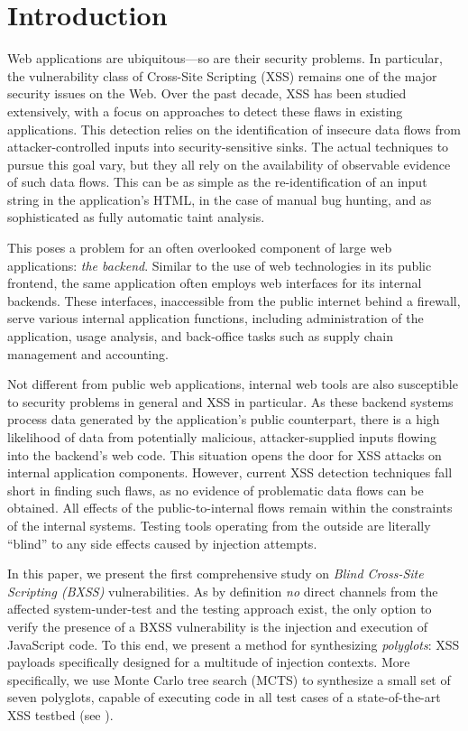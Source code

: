 \section{Introduction}


Web applications are ubiquitous---so are their security problems.
In particular, the vulnerability class of Cross-Site Scripting (XSS) remains one of the major security issues on the Web.
Over the past decade, XSS has been studied extensively, with a focus on approaches to detect these flaws in existing applications.
This detection relies on the identification of insecure data flows from attacker-controlled inputs into security-sensitive sinks. 
The actual techniques to pursue this goal vary, but they all rely on the availability of observable evidence of such data flows.
This can be as simple as the re-identification of an input string in the application's HTML, in the case of manual bug hunting, and as sophisticated as fully automatic taint analysis.

This poses a problem for an often overlooked component of large web applications: \emph{the backend}. Similar to the use of web technologies in its public frontend, the same application often employs web interfaces for its internal backends.
These interfaces, inaccessible from the public internet behind a firewall, serve various internal application functions, including administration of the application, usage analysis, and back-office tasks such as supply chain management and accounting. 

Not different from public web applications, internal web tools are also susceptible to security problems in general and XSS in particular. 
As these backend systems process data generated by the application's public counterpart, there is a high likelihood of data from potentially malicious, attacker-supplied inputs flowing into the backend's web code. 
This situation opens the door for XSS attacks on internal application components.
However, current XSS detection techniques fall short in finding such flaws, as no evidence of problematic data flows can be obtained. All effects of the public-to-internal flows remain within the constraints of the internal systems.
Testing tools operating from the outside are literally ``blind'' to any side effects caused by injection attempts. 

In this paper, we present the first comprehensive study on \textit{Blind Cross-Site Scripting (BXSS)} vulnerabilities. As by definition \textit{no} direct channels from the affected system-under-test and the testing approach exist, the only option to verify the presence of a BXSS vulnerability is the injection and execution of JavaScript code. 
To this end, we present a method for synthesizing \emph{polyglots}: XSS payloads specifically designed for a multitude of injection contexts. More specifically, we use Monte Carlo tree search (MCTS) to synthesize a small set of seven polyglots, capable of executing code in all test cases of a state-of-the-art XSS testbed (see ). 

